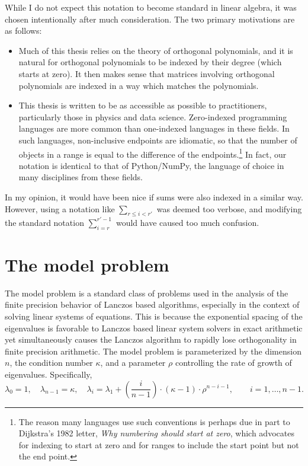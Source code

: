 While I do not expect this notation to become standard in linear algebra, it was chosen intentionally after much consideration. 
The two primary motivations are as follows:
\begin{itemize}
    \item Much of this thesis relies on the theory of orthogonal polynomials, and it is natural for orthogonal polynomials to be indexed by their degree (which starts at zero). 
    It then makes sense that matrices involving orthogonal polynomials are indexed in a way which matches the polynomials.
        
    \item This thesis is written to be as accessible as possible to practitioners, particularly those in physics and data science.
        Zero-indexed programming languages are more common than one-indexed languages in these fields. 
        In such languages, non-inclusive endpoints are idiomatic, so that the number of objects in a range is equal to the difference of the endpoints.\footnote{The reason many languages use such conventions is perhaps due in part to Dijkstra's 1982 letter, \emph{Why numbering should start at zero}, which advocates for indexing to start at zero and for ranges to include the start point but not the end point.}
        In fact, our notation is identical to that of Python/NumPy, the language of choice in many disciplines from these fields.
\end{itemize}

In my opinion, it would have been nice if sums were also indexed in a similar way. 
However, using a notation like \( \sum_{r\leq i<r'} \) was deemed too verbose, and modifying the standard notation \( \sum_{i=r}^{r'-1} \) would have caused too much confusion.


\section{The model problem}

The model problem \cite{strakos_91,strakos_greenbaum_92} is a standard class of problems used in the analysis of the finite precision behavior of Lanczos based algorithms, especially in the context of solving linear systems of equations.
This is because the exponential spacing of the eigenvalues is favorable to Lanczos based linear system solvers in exact arithmetic yet simultaneously causes the Lanczos algorithm to rapidly lose orthogonality in finite precision arithmetic.
The model problem is parameterized by the dimension \( n \), the condition number \( \kappa \), and a parameter \( \rho \) controlling the rate of growth of eigenvalues.
Specifically,
\begin{equation}
    \label{eqn:model_problem}
    \lambda_0 = 1
    ,\quad \lambda_{n-1} = \kappa
    ,\quad \lambda_i = \lambda_1 + \left( \frac{i}{n-1} \right) \cdot (\kappa -1) \cdot \rho^{n-i-1}
    ,\qquad i=1,\ldots, n-1.
\end{equation}


